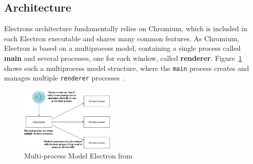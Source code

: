 \subsection{Architecture}
\label{subsec:electron:architecture}
Electrons architecture fundamentally relies on Chromium, which is included in each Electron executable and shares many common features.
As Chromium, Electron is based on a multiprocess model, containing a single process called \textbf{main} and several processes, one for each window, called \textbf{renderer}.
Figure~\ref{fig:electron:model} shows such a multiprocess model structure, where the \texttt{main} process creates and manages multiple \texttt{renderer} processes~\cite{electron-in-action}.
\begin{figure}[ht]
    \centering
    \includegraphics[width=0.4\textwidth]{images/electron-model}
    \caption[Bla]{Multi-process Model Electron from~\cite[Fig. 1.7]{electron-in-action}}
    \label{fig:electron:model}
\end{figure}
